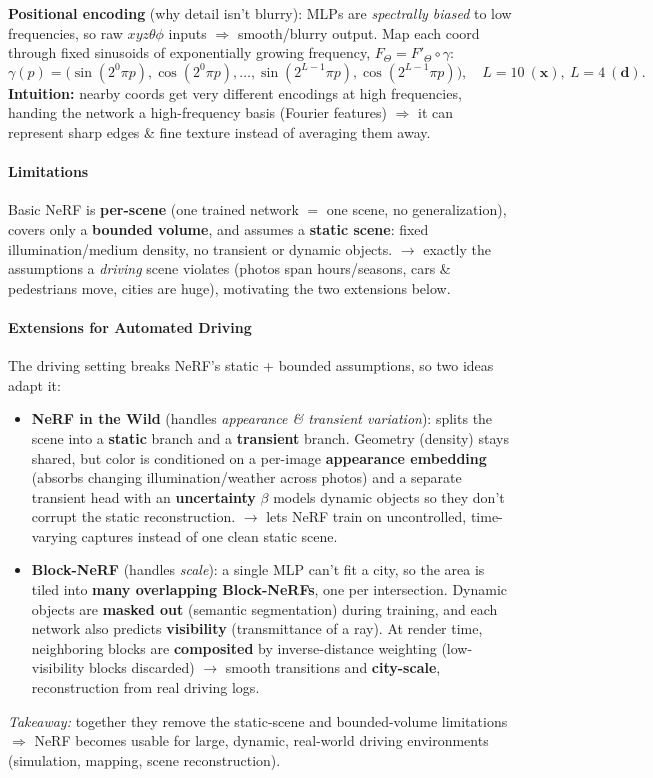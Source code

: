 \documentclass{article}
\begin{document}
\textbf{Positional encoding} (why detail isn't blurry): MLPs are \textit{spectrally biased} to low frequencies, so raw $xyz\theta\phi$ inputs $\Rightarrow$ smooth/blurry output. Map each coord through fixed sinusoids of exponentially growing frequency, $F_\Theta=F'_\Theta\circ\gamma$:
\[
\gamma(p)=\big(\sin(2^0\pi p),\cos(2^0\pi p),\dots,\sin(2^{L-1}\pi p),\cos(2^{L-1}\pi p)\big),
\quad L{=}10\ (\mathbf x),\ L{=}4\ (\mathbf d).
\]
\textbf{Intuition:} nearby coords get very different encodings at high frequencies, handing the network a high-frequency basis (Fourier features) $\Rightarrow$ it can represent sharp edges \& fine texture instead of averaging them away.

\paragraph{Limitations} Basic NeRF is \textbf{per-scene} (one trained network $=$ one scene, no generalization), covers only a \textbf{bounded volume}, and assumes a \textbf{static scene}: fixed illumination/medium density, no transient or dynamic objects. $\rightarrow$ exactly the assumptions a \textit{driving} scene violates (photos span hours/seasons, cars \& pedestrians move, cities are huge), motivating the two extensions below.

\paragraph{Extensions for Automated Driving} The driving setting breaks NeRF's static + bounded assumptions, so two ideas adapt it:
\begin{itemize}
    \item \textbf{NeRF in the Wild} (handles \textit{appearance \& transient variation}): splits the scene into a \textbf{static} branch and a \textbf{transient} branch. Geometry (density) stays shared, but color is conditioned on a per-image \textbf{appearance embedding} (absorbs changing illumination/weather across photos) and a separate transient head with an \textbf{uncertainty} $\beta$ models dynamic objects so they don't corrupt the static reconstruction. $\rightarrow$ lets NeRF train on uncontrolled, time-varying captures instead of one clean static scene.
    \item \textbf{Block-NeRF} (handles \textit{scale}): a single MLP can't fit a city, so the area is tiled into \textbf{many overlapping Block-NeRFs}, one per intersection. Dynamic objects are \textbf{masked out} (semantic segmentation) during training, and each network also predicts \textbf{visibility} (transmittance of a ray). At render time, neighboring blocks are \textbf{composited} by inverse-distance weighting (low-visibility blocks discarded) $\rightarrow$ smooth transitions and \textbf{city-scale}, reconstruction from real driving logs.
\end{itemize}
\textit{Takeaway:} together they remove the static-scene and bounded-volume limitations $\Rightarrow$ NeRF becomes usable for large, dynamic, real-world driving environments (simulation, mapping, scene reconstruction).
\end{document}

